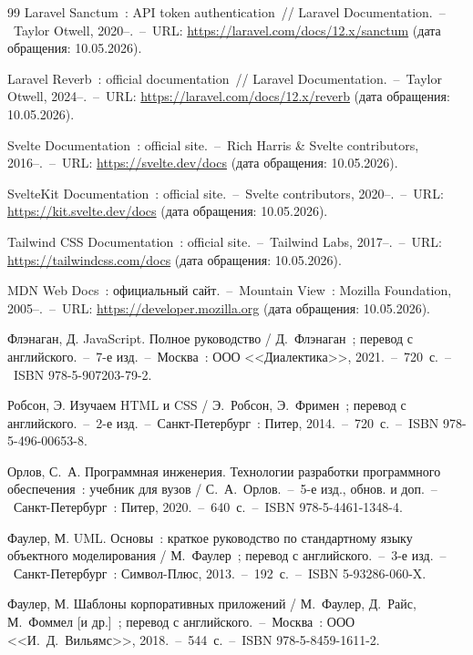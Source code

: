\begin{thebibliography}{99}
 Laravel Sanctum~: API token authentication~// Laravel Documentation.~--~Taylor Otwell, 2020--.~--~URL: \url{https://laravel.com/docs/12.x/sanctum} (дата обращения: 10.05.2026).

 Laravel Reverb~: official documentation~// Laravel Documentation.~--~Taylor Otwell, 2024--.~--~URL: \url{https://laravel.com/docs/12.x/reverb} (дата обращения: 10.05.2026).

 Svelte Documentation~: official site.~--~Rich Harris \& Svelte contributors, 2016--.~--~URL: \url{https://svelte.dev/docs} (дата обращения: 10.05.2026).

 SvelteKit Documentation~: official site.~--~Svelte contributors, 2020--.~--~URL: \url{https://kit.svelte.dev/docs} (дата обращения: 10.05.2026).

 Tailwind CSS Documentation~: official site.~--~Tailwind Labs, 2017--.~--~URL: \url{https://tailwindcss.com/docs} (дата обращения: 10.05.2026).

 MDN Web Docs~: официальный сайт.~--~Mountain View~: Mozilla Foundation, 2005--.~--~URL: \url{https://developer.mozilla.org} (дата обращения: 10.05.2026).

 Флэнаган, Д. JavaScript. Полное руководство / Д.~Флэнаган~; перевод с английского.~--~7-е изд.~--~Москва~: ООО <<Диалектика>>, 2021.~--~720~с.~--~ISBN 978-5-907203-79-2.

 Робсон, Э. Изучаем HTML и CSS / Э.~Робсон, Э.~Фримен~; перевод с английского.~--~2-е изд.~--~Санкт-Петербург~: Питер, 2014.~--~720~с.~--~ISBN 978-5-496-00653-8.

 Орлов, С.~А. Программная инженерия. Технологии разработки программного обеспечения~: учебник для вузов / С.~А.~Орлов.~--~5-е изд., обнов. и доп.~--~Санкт-Петербург~: Питер, 2020.~--~640~с.~--~ISBN 978-5-4461-1348-4.

 Фаулер, М. UML. Основы~: краткое руководство по стандартному языку объектного моделирования / М.~Фаулер~; перевод с английского.~--~3-е изд.~--~Санкт-Петербург~: Символ-Плюс, 2013.~--~192~с.~--~ISBN 5-93286-060-X.

 Фаулер, М. Шаблоны корпоративных приложений / М.~Фаулер, Д.~Райс, М.~Фоммел [и др.]~; перевод с английского.~--~Москва~: ООО <<И.~Д.~Вильямс>>, 2018.~--~544~с.~--~ISBN 978-5-8459-1611-2.


\end{thebibliography}
